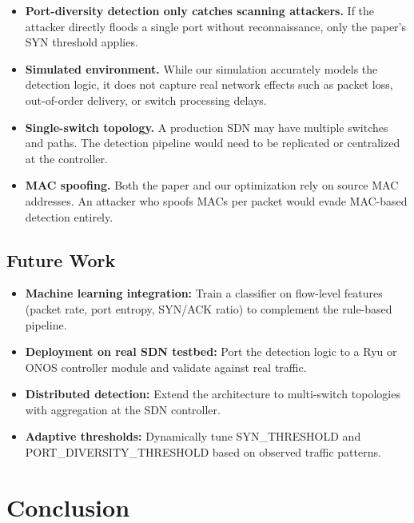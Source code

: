 \documentclass[12pt, a4paper]{article}
\begin{document}
\begin{itemize}[itemsep=3pt]
    \item \textbf{Port-diversity detection only catches scanning attackers.} If the attacker directly floods a single port without reconnaissance, only the paper's SYN threshold applies.
    \item \textbf{Simulated environment.} While our simulation accurately models the detection logic, it does not capture real network effects such as packet loss, out-of-order delivery, or switch processing delays.
    \item \textbf{Single-switch topology.} A production SDN may have multiple switches and paths. The detection pipeline would need to be replicated or centralized at the controller.
    \item \textbf{MAC spoofing.} Both the paper and our optimization rely on source MAC addresses. An attacker who spoofs MACs per packet would evade MAC-based detection entirely.
\end{itemize}

\subsection{Future Work}

\begin{itemize}[itemsep=3pt]
    \item \textbf{Machine learning integration:} Train a classifier on flow-level features (packet rate, port entropy, SYN/ACK ratio) to complement the rule-based pipeline.
    \item \textbf{Deployment on real SDN testbed:} Port the detection logic to a Ryu or ONOS controller module and validate against real traffic.
    \item \textbf{Distributed detection:} Extend the architecture to multi-switch topologies with aggregation at the SDN controller.
    \item \textbf{Adaptive thresholds:} Dynamically tune SYN\_\allowbreak THRESHOLD and PORT\_\allowbreak DIVERSITY\_\allowbreak THRESHOLD based on observed traffic patterns.
\end{itemize}

\newpage

\section*{Conclusion}
\end{document}
